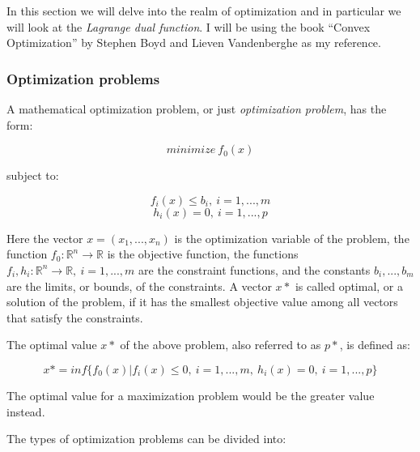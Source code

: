 \documentclass{article}
\begin{document}
In this section we will delve into the realm of optimization and in
particular we will look at the \emph{Lagrange dual function}. I will be
using the book ``Convex Optimization'' by Stephen Boyd and Lieven
Vandenberghe as my reference.

\subsubsection{Optimization problems}\label{optimization-problems}

A mathematical optimization problem, or just \emph{optimization
problem}, has the form:

\[minimize\ f_0(x)\]

subject to:

\[f_i(x)\le b_i,\ i=1, ..., m\] \[h_i(x) = 0,\ i=1, ..., p\]

Here the vector \(x=(x_1, ..., x_n)\) is the optimization variable of
the problem, the function \(f_0: \mathbb{R}^n \rightarrow \mathbb{R}\)
is the objective function, the functions
\(f_i, h_i: \mathbb{R}^n \rightarrow \mathbb{R},\ i=1,
..., m\) are the constraint functions, and the constants
\(b_i, ..., b_m\) are the limits, or bounds, of the constraints. A
vector \(x*\) is called optimal, or a solution of the problem, if it has
the smallest objective value among all vectors that satisfy the
constraints.

The optimal value \(x*\) of the above problem, also referred to as
\(p*\), is defined as:

\[x* = inf\{ f_0(x) | f_i(x) \le 0,\ i=1, ..., m,\ h_i(x)=0,\ i=1,
..., p \}\]

The optimal value for a maximization problem would be the greater value
instead.

The types of optimization problems can be divided into:
\end{document}
